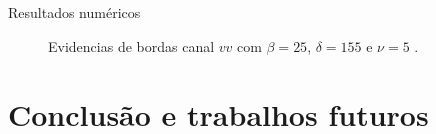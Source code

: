 \documentclass[10pt]{beamer}
\begin{document}
\begin{frame}{Resultados numéricos}
\begin{figure}[hbt]
	\caption{Evidencias de bordas canal $vv$ com $\beta = 25$, $\delta = 155$ e $\nu = 5$ .}
\endminipage\hfill
\end{figure}

\end{frame}

\section{Conclusão e trabalhos futuros}
\end{document}
